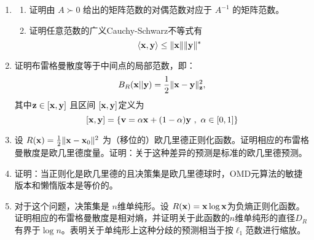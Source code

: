 \begin{enumerate}
	\item \label{exercise:dualnorm}
	\begin{enumerate}
	\item
	证明由 $A \succ 0$ 给出的矩阵范数的对偶范数对应于 $A^{-1}$ 的矩阵范数。
	\item
	证明任意范数的广义Cauchy-Schwarz不等式有
	$$ \langle \mathbf x , \mathbf y \rangle \leq \|\mathbf x \| \|\mathbf y \|^*$$ 
	\end{enumerate}

	
	\item
	证明布雷格曼散度等于中间点的局部范数，即：
	$$ B_{R}(\mathbf x||\mathbf y) = \frac{1}{2} \|\mathbf x - \mathbf y\|_{\mathbf z}^2, $$ 
	其中$\mathbf z \in [\mathbf x,\mathbf y]$ 且区间 $[\mathbf x,\mathbf{y}]$定义为
	$$ [\mathbf{x},\mathbf{y}] = \{ \mathbf v  = \alpha \mathbf{x} + (1-\alpha) \mathbf{y} \ , \ \alpha \in [0,1] \}$$
	
	\item \label{exercise:bregman-Euclid}
	设 ${R}(\mathbf x) = \frac{1}{2} \|\mathbf x - \mathbf x_0\|^2$ 为（移位的）欧几里德正则化函数。证明相应的布雷格曼散度是欧几里德度量。证明：关于这种差异的预测是标准的欧几里德预测。
	
	\item \label{exercise:equiv-lazy-agile}
	 证明：当正则化是欧几里德的且决策集是欧几里德球时，OMD元算法的敏捷版本和懒惰版本是等价的。
	 
	 \item \label{exercise:bregman-entropy}
	 对于这个问题，决策集是 $n$维单纯形。设 ${R}(\mathbf x) = \mathbf x \log \mathbf x $为负熵正则化函数。证明相应的布雷格曼散度是相对熵，并证明关于此函数的$n$维单纯形的直径$D_R$有界于$\log n$。表明关于单纯形上这种分歧的预测相当于按$\ell_1$范数进行缩放。
	 

\end{enumerate}
